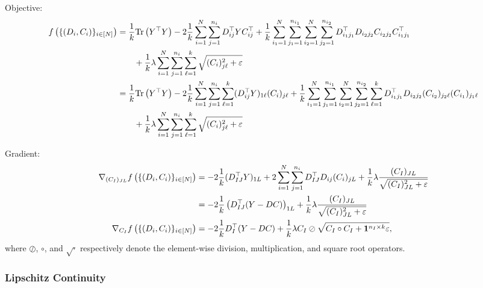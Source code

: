 Objective:
\begin{align}
    f\left(\{(D_i,C_i)\}_{i\in[N]}\right)
    &= \frac{1}{k} \text{Tr}\left( Y^\top Y \right)
    - 2 \frac{1}{k} \sum_{i=1}^N \sum_{j=1}^{n_i} D_{ij}^\top Y C_{ij}^\top
    + \frac{1}{k} \sum_{i_1=1}^N \sum_{j_1=1}^{n_{i_1}} \sum_{i_2=1}^N \sum_{j_2=1}^{n_{i_2}} D_{i_1j_1}^\top D_{i_2j_2} C_{i_2j_2} C_{i_1j_1}^\top \\
    &\qquad + \frac{1}{k} \lambda \sum_{i=1}^N \sum_{j=1}^{n_i} \sum_{\ell=1}^k \sqrt{(C_i)_{j\ell}^2 + \varepsilon}
    \\
    &= \frac{1}{k} \text{Tr}\left( Y^\top Y \right)
    - 2 \frac{1}{k} \sum_{i=1}^N \sum_{j=1}^{n_i} \sum_{\ell=1}^k (D_{ij}^\top Y)_{1\ell} (C_i)_{j\ell}
    + \frac{1}{k} \sum_{i_1=1}^N \sum_{j_1=1}^{n_{i_1}} \sum_{i_2=1}^N \sum_{j_2=1}^{n_{i_2}} \sum_{\ell=1}^k D_{i_1j_1}^\top D_{i_2j_2} (C_{i_2})_{j_2\ell} (C_{i_1})_{j_1\ell} \\
    &\qquad + \frac{1}{k} \lambda \sum_{i=1}^N \sum_{j=1}^{n_i} \sum_{\ell=1}^k \sqrt{(C_i)_{j\ell}^2 + \varepsilon}
\end{align}

Gradient:
\begin{align}
    \nabla_{(C_I)_{JL}} f\left(\{(D_i,C_i)\}_{i\in[N]}\right)
    &= -2 \frac{1}{k} (D_{IJ}^\top Y)_{1L} + 2\sum_{i=1}^N \sum_{j=1}^{n_i} D_{IJ}^\top D_{ij} (C_i)_{jL}
    + \frac{1}{k} \lambda \frac{(C_I)_{JL}}{\sqrt{(C_I)_{JL}^2 + \varepsilon}}
    \\
    &= -2 \frac{1}{k} \left( D_{IJ}^\top (Y - DC) \right)_{1L} 
    + \frac{1}{k} \lambda \frac{(C_I)_{JL}}{\sqrt{(C_I)_{JL}^2 + \varepsilon}}
    \\
    \nabla_{C_I} f\left(\{(D_i,C_i)\}_{i\in[N]}\right)
    &= -2 \frac{1}{k} D_I^\top (Y - DC) + \frac{1}{k} \lambda C_I \oslash \sqrt{C_I \circ C_I + \mathbf{1}^{n_I\times k} \varepsilon},
\end{align}
where $\oslash$, $\circ$, and $\sqrt{\cdot}$ respectively denote the element-wise division, multiplication, and square root operators.


\subsubsection{Lipschitz Continuity}

